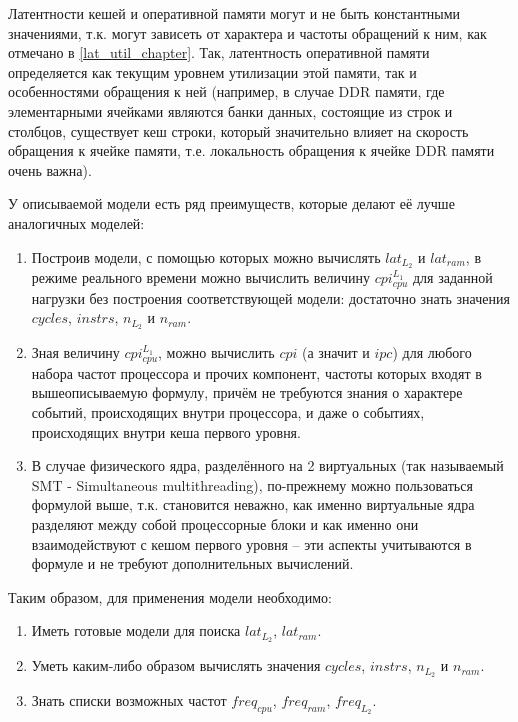     Латентности кешей и оперативной памяти могут и не быть константными значениями, т.к.
    могут зависеть от характера и частоты обращений к ним, как отмечано в \ref{lat_util_chapter}.
    Так, латентность оперативной памяти определяется как текущим уровнем утилизации этой памяти,
    так и особенностями обращения к ней (например, в случае DDR памяти,
    где элементарными ячейками являются банки данных, состоящие из строк и столбцов,
    существует кеш строки, который значительно влияет на скорость обращения
    к ячейке памяти, т.е. локальность обращения к ячейке DDR памяти очень важна).

    У описываемой модели есть ряд преимуществ, которые делают её лучше аналогичных моделей:
    \begin{enumerate}
        \item Построив модели, с помощью которых можно вычислять $lat_{L_2}$ и $lat_{ram}$,
        в режиме реального времени можно вычислить величину $cpi_{cpu}^{L_1}$ для
        заданной нагрузки без построения соответствующей модели: достаточно знать значения
        $cycles$, $instrs$, $n_{L_2}$ и $n_{ram}$.
        \item Зная величину $cpi_{cpu}^{L_1}$, можно вычислить $cpi$ (а значит и $ipc$)
        для любого набора частот процессора и прочих компонент, частоты которых входят в
        вышеописываемую формулу, причём не требуются знания о характере событий,
        происходящих внутри процессора, и даже о событиях, происходящих внутри кеша первого уровня.
        \item В случае физического ядра, разделённого на 2 виртуальных (так называемый
        SMT - Simultaneous multithreading), по-прежнему можно пользоваться формулой выше, т.к.
        становится неважно, как именно виртуальные ядра разделяют между собой процессорные блоки
        и как именно они взаимодействуют с кешом первого уровня -- эти аспекты учитываются
        в формуле и не требуют дополнительных вычислений.
    \end{enumerate}

    Таким образом, для применения модели необходимо:
    \begin{enumerate}
        \item Иметь готовые модели для поиска $lat_{L_2}$, $lat_{ram}$.
        \item Уметь каким-либо образом вычислять значения $cycles$, $instrs$, $n_{L_2}$ и $n_{ram}$.
        \item Знать списки возможных частот $freq_{cpu}$, $freq_{ram}$, $freq_{L_2}$.
    \end{enumerate}

